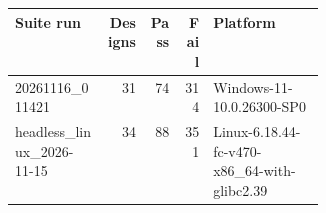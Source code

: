 \begin{tabular}{@{}lrrr>{\raggedright\arraybackslash}p{0.36\linewidth}@{}}
\toprule
Suite run & Designs & Pass & Fail & Platform\\
\midrule
20261116\_011421 & 31 & 74 & 314 & Windows-11-10.0.26300-SP0\\
headless\_linux\_2026-11-15 & 34 & 88 & 351 & Linux-6.18.44-fc-v470-x86\_64-with-glibc2.39\\
\bottomrule
\end{tabular}
